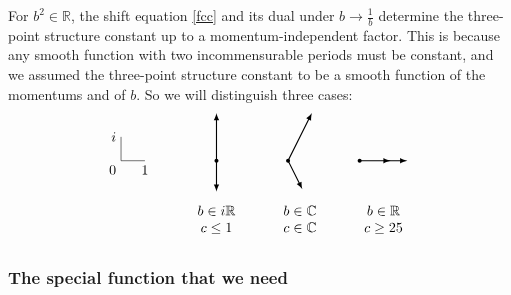 \documentclass[12pt, a4paper, notitlepage, twoside]{report}
\numberwithin{equation}{section}
\theoremstyle{break}
\begin{document}
For $b^2\in \mathbb{R}$, the shift equation \eqref{fcc} and its dual under $b\to \frac{1}{b}$ 
determine the three-point structure constant up to a momentum-independent factor. 
This is because any smooth function with two incommensurable periods must be constant, and we assumed the three-point structure constant to be a smooth function of the momentums and of $b$.
So we will distinguish three cases:
\begin{equation}
 \begin{tikzpicture}[baseline=(current  bounding  box.center), scale = .6]
\draw (0, 2) node[left]{$i$} -- (0, 1) node[below left] {$0$} -- (1, 1) node[below] {$1$};
\draw [thick, latex-latex] (4,3) -- (4,1) node[fill, circle, minimum size = 1mm, inner sep = 0]{} -- (4,-.3);
\draw [thick, latex-latex] (8,3) -- (7,1) node[fill, circle, minimum size = 1mm, inner sep = 0]{}-- (7.6,-.2);
\draw [thick, latex-latex] (12,1) -- (10,1) node[fill, circle, minimum size = 1mm, inner sep = 0]{} -- (11.3,1) ;
\node at (4, -1.5){$\begin{array}{c} b\in i\mathbb{R} \\ c\leq 1 \end{array}$};
\node at (7.5, -1.5){$\begin{array}{c} b\in \mathbb{C} \\ c\in\mathbb{C} \end{array}$};
\node at (11, -1.5){$\begin{array}{c} b\in \mathbb{R} \\ c\geq 25 \end{array}$};
 \end{tikzpicture}
\end{equation}

\subsubsection{The special function that we need}
\end{document}
